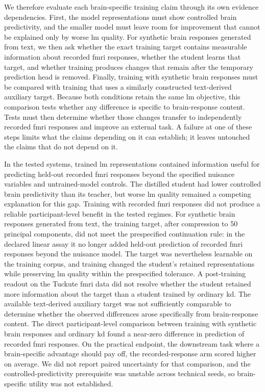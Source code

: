 We therefore evaluate each brain-specific training claim through its own evidence dependencies.
First, the model representations must show controlled brain predictivity, and the smaller model must leave room for improvement that cannot be explained only by worse \ac{lm} quality.
For synthetic brain responses generated from text, we then ask whether the exact training target contains measurable information about recorded \ac{fmri} responses, whether the student learns that target, and whether training produces changes that remain after the temporary prediction head is removed.
Finally, training with synthetic brain responses must be compared with training that uses a similarly constructed text-derived auxiliary target.
Because both conditions retain the same \ac{lm} objective, this comparison tests whether any difference is specific to brain-response content.
Tests must then determine whether those changes transfer to independently recorded \ac{fmri} responses and improve an external task.
A failure at one of these steps limits what the claims depending on it can establish; it leaves untouched the claims that do not depend on it.

In the tested systems, trained \ac{lm} representations contained information useful for predicting held-out recorded \ac{fmri} responses beyond the specified nuisance variables and untrained-model controls.
The distilled student had lower controlled brain predictivity than its teacher, but worse \ac{lm} quality remained a competing explanation for this gap.
Training with recorded \ac{fmri} responses did not produce a reliable participant-level benefit in the tested regimes.
For synthetic brain responses generated from text, the training target, after compression to 50 principal components, did not meet the prespecified continuation rule: in the declared linear assay it no longer added held-out prediction of recorded \ac{fmri} responses beyond the nuisance model.
The target was nevertheless learnable on the training corpus, and training changed the student's retained representations while preserving \ac{lm} quality within the prespecified tolerance.
A post-training readout on the Tuckute \ac{fmri} data did not resolve whether the student retained more information about the target than a student trained by ordinary \ac{kd}.
The available text-derived auxiliary target was not sufficiently comparable to determine whether the observed differences arose specifically from brain-response content.
The direct participant-level comparison between training with synthetic brain responses and ordinary \ac{kd} found a near-zero difference in prediction of recorded \ac{fmri} responses.
On the practical endpoint, the downstream task where a brain-specific advantage should pay off, the recorded-response arm scored higher on average.
We did not report paired uncertainty for that comparison, and the controlled-predictivity prerequisite was unstable across technical seeds, so brain-specific utility was not established.

